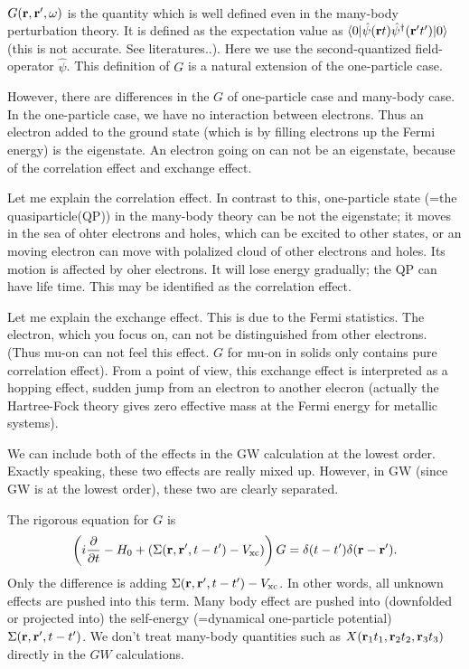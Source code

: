 \\
$G({\bf r},{\bf r}',\omega)$ is the quantity which is well defined
even in the many-body perturbation theory. It is defined
as the expectation value as 
$\langle 0|\hat{\psi}({\bf r} t) \hat{\psi}^\dagger({\bf r}' t')| 0 \rangle$
(this is not accurate. See literatures..). Here we use
the second-quantized field-operator $\hat{\psi}$. This definition
of $G$ is a natural extension of the one-particle case.

However, there are differences in the $G$ of one-particle
case and many-body case. 
In the one-particle case, we have no interaction between electrons.
Thus an electron added to the ground state (which is by filling electrons up the Fermi energy) is the eigenstate. 
An electron going on can not be an eigenstate,
because of the correlation effect and exchange effect.

Let me explain the correlation effect.
In contrast to this, one-particle state 
(=the quasiparticle(QP))
in the many-body theory can be not the eigenstate; 
it moves in the sea of ohter electrons and holes, which can be excited to other states, or an moving electron can move with polalized cloud of other electrons and holes.  Its motion is affected by oher electrons. It will lose
energy gradually; the QP can have life time.
This may be identified as the correlation effect.

Let me explain the exchange effect.
This is due to the Fermi statistics.
The electron, which you focus on, can not be distinguished from other electrons. (Thus mu-on can not feel this effect.
$G$ for mu-on in solids only contains pure correlation effect). 
From a point of view, this exchange effect is interpreted as 
a hopping effect, sudden jump from an electron to another elecron
(actually the Hartree-Fock theory gives zero effective mass at the Fermi energy for metallic systems).

We can include both of the effects in the GW calculation at the lowest
order. Exactly speaking, these two effects are really mixed up. However,
in GW (since GW is at the lowest order), these two are clearly separated.


The rigorous equation for $G$ is
\begin{eqnarray}
\left(i \frac{\partial }{\partial t} - H_0 + 
(\Sigma({\bf r},{\bf r}',t-t')-V_{\rm xc})\right) G
= \delta(t-t')\delta({\bf r}-{\bf r}'). \label{gdef}
\end{eqnarray}
Only the difference is adding 
$\Sigma({\bf r},{\bf r}',t-t')-V_{\rm xc}$.
In other words, all unknown effects are pushed into this term.
Many body effect are pushed into (downfolded or projected into) 
the self-energy (=dynamical one-particle potential)
$\Sigma({\bf r},{\bf r}',t-t')$. 
We don't treat many-body quantities such as
$X({\bf r}_1 t_1, {\bf r}_2 t_2, {\bf r}_3 t_3)$ directly in the $GW$
calculations.

